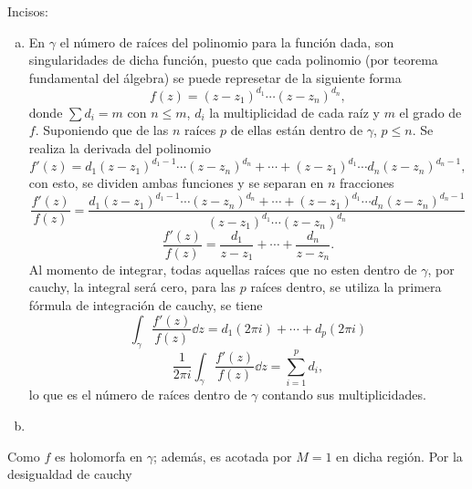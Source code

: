 \begin{mdframed}[style = warning]
	\begin{problem}
		Incisos:
		\begin{enumerate}[a)]
			\item En $\gamma$ el número de raíces del polinomio para la función dada, son singularidades de dicha función, puesto que cada polinomio (por teorema fundamental del álgebra) se puede represetar de la siguiente forma
				$$f(z) = (z - z_1)^{d_1} \cdots (z - z_n)^{d_n},$$
			donde $\sum d_{i} = m$ con $n \leq m$, $d_i$ la multiplicidad de cada raíz y $m$ el grado de $f$. Suponiendo que de las $n$ raíces $p$ de ellas están dentro de $\gamma$, $p\leq n$. Se realiza la derivada del polinomio
				$$f'(z) = d_1 (z - z_1) ^{d_1 - 1} \cdots (z - z_n)^{d_n} + \cdots + (z - z_1)^{d_1} \cdots d_n (z - z_n)^{d_n - 1},$$
			con esto, se dividen ambas funciones y se separan en $n$ fracciones
				$$\frac{f'(z)}{f(z)} = \frac{d_1 (z - z_1) ^{d_1 - 1} \cdots (z - z_n)^{d_n} + \cdots + (z - z_1)^{d_1} \cdots d_n (z - z_n)^{d_n - 1}}{(z - z_1)^{d_1} \cdots (z - z_n)^{d_n}}$$
				$$\frac{f'(z)}{f(z)} = \frac{d_1}{z - z_1} + \cdots + \frac{d_n}{z - z_n}.$$
			Al momento de integrar, todas aquellas raíces que no esten dentro de $\gamma$, por cauchy, la integral será cero, para las $p$ raíces dentro, se utiliza la primera fórmula de integración de cauchy, se tiene
				$$\int _{\gamma} \frac{f'(z)}{f(z)} \dd{z} = d_1 (2\pi i) + \cdots + d_p (2\pi i)$$
				$$\frac{1}{2\pi i} \int _{\gamma} \frac{f'(z)}{f(z)} \dd{z} = \sum _{i = 1} ^p d_i,$$
			lo que es el número de raíces dentro de $\gamma$ contando sus multiplicidades.
			\item 
		\end{enumerate}
	\end{problem}
\end{mdframed}






















\begin{mdframed}[style = warning]
	\begin{problem}
		Como $f$ es holomorfa en $\gamma$; además, es acotada por $M = 1$ en dicha región. Por la desigualdad de cauchy
	\end{problem}
\end{mdframed}














